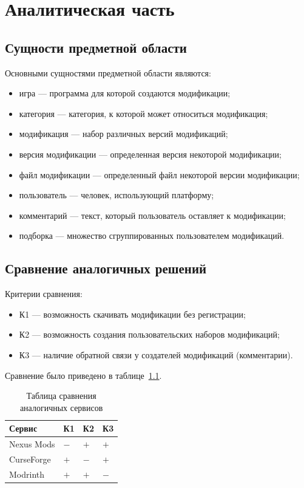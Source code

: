 \chapter{Аналитическая часть}

\section{Сущности предметной области}

Основными сущностями предметной области являются:
\begin{itemize}
	\item игра --- программа для которой создаются модификации;
	\item категория --- категория, к которой может относиться модификация;
	\item модификация --- набор различных версий модификаций;
	\item версия модификации --- определенная версия некоторой модификации;
	\item файл модификации --- определенный файл некоторой версии модификации;
	\item пользователь --- человек, использующий платформу;
	\item комментарий --- текст, который пользователь оставляет к модификации;
	\item подборка --- множество сгруппированных пользователем модификаций.
\end{itemize}

\section{Сравнение аналогичных решений}

Критерии сравнения:
\begin{itemize}
	\item К1 --- возможность скачивать модификации без регистрации;
	\item К2 --- возможность создания пользовательских наборов модификаций;
	\item К3 --- наличие обратной связи у создателей модификаций (комментарии).
\end{itemize}

Сравнение было приведено в таблице~\ref{tab:comp}.
\begin{table}[H]
	\centering
	\caption{Таблица сравнения аналогичных сервисов}
	\label{tab:comp}
	\begin{tabularx}{\textwidth}{|X|X|X|X|}
		\hline
		\textbf{Сервис} & \textbf{К1} & \textbf{К2} & \textbf{К3} \\
		\hline
		Nexus Mods & $-$ & $+$ & $+$ \\
		\hline
		CurseForge & $+$ & $-$ & $+$ \\
		\hline
		Modrinth & $+$ & $+$ & $-$ \\
		\hline
	\end{tabularx}
\end{table}

